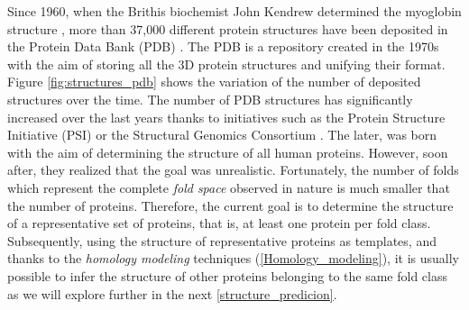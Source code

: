 \documentclass[11pt, b5paper,twoside]{tesi_upf}
\begin{document}
\par Since 1960, when the Brithis biochemist John Kendrew determined the myoglobin structure \cite{KENDREW1960}, more than 37,000 different protein structures have been deposited in the Protein Data Bank (PDB) \cite{Berman2000}. The PDB is a repository created in the 1970s with the aim of storing all the 3D protein structures and unifying their format. Figure \ref{fig:structures_pdb} shows the variation of the number of deposited structures over the time. The number of PDB structures has significantly increased over the last years thanks to initiatives such as the Protein Structure Initiative (PSI) \cite{Norvell2007} or the Structural Genomics Consortium \cite{GIleadi2007}. The later, was born with the aim of determining the structure of all human proteins. However, soon after, they realized that the goal was unrealistic. Fortunately, the number of folds which represent the complete \textit{fold space} observed in nature is much smaller that the number of proteins. Therefore, the current goal is to determine the structure of a representative set of proteins, that is, at least one protein per fold class. Subsequently, using the structure of representative proteins as templates, and thanks to the \textit{homology modeling} techniques (\cref{Homology_modeling}), it is usually possible to infer the structure of other proteins belonging to the same fold class as we will explore further in the next \cref{structure_predicion}.
\end{document}
